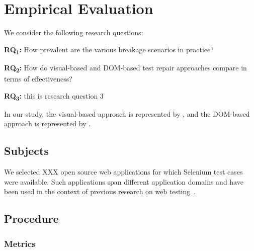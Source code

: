 
\section{Empirical Evaluation}\label{sec:evaluation}

We consider the following research questions:

\noindent
\textbf{RQ\textsubscript{1}:} How prevalent are the various breakage scenarios in practice?

\noindent
\textbf{RQ\textsubscript{2}:} How do visual-based and DOM-based test repair approaches compare in terms of effectiveness?

\noindent%
\textbf{RQ\textsubscript{3}:} this is research question 3

\noindent
In our study, the visual-based approach is represented by \tool, and the DOM-based approach is represented by \water.

\subsection{Subjects}\label{sec:subjects}

We selected XXX open source web applications for which Selenium test cases were available. Such applications span different application domains and have been used in the context of previous research on web testing~\cite{}.

\subsection{Procedure}\label{sec:procedure}

\subsubsection{Metrics}

